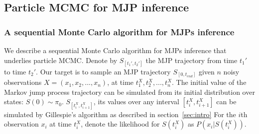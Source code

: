 \subsection{Particle MCMC for MJP inference}
\label{sec:pmcmc}
\subsubsection{A sequential Monte Carlo algorithm for MJPs inference}
We describe a sequential Monte Carlo algorithm for MJPs inference that underlies particle MCMC. 
Denote by $S_{[t_1', t_2']}$ the MJP trajectory from time $t_1'$ to time $t_2'$. 
Our target is to sample an MJP trajectory $S_{[0, t_{end}]}$ given $n$ noisy observations $X =(x_1, x_2, ... , x_n)$, at time $t_1^X, t_2^X, ..., t_n^X$. 
The initial value of the Markov jump process trajectory can be simulated from its initial distribution over states: $S(0) \sim \pi_0$. 
$S_{[t_i^X, t_{i + 1}^X]} $, its values over any interval $[t_i^X, t_{i+1}^X]$ can be simulated by Gillespie's algorithm as described in section~\ref{sec:intro} 
For the $i$th observation $x_i$ at time $t^X_i$, denote the likelihood for $S(t^X_i)$ as $P(x_i | S(t^X_i))$.



